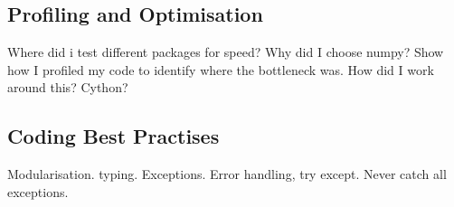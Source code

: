     \subsection{Profiling and Optimisation}\label{subsec:profiling-and-optimisation}
    Where did i test different packages for speed? Why did I choose numpy?
    Show how I profiled my code to identify where the bottleneck was.
    How did I work around this? Cython?

    \subsection{Coding Best Practises}\label{subsec:coding-best-practises}
    Modularisation.
    typing.
    Exceptions. Error handling, try except. Never catch all exceptions.